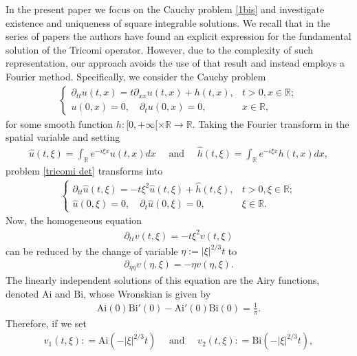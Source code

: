 \documentclass{article}
\begin{document}
In the present paper we focus on the Cauchy problem \eqref{1bis} and investigate existence and uniqueness of square integrable solutions. We recall that in the series of papers \cite{Gelfand1,Gelfand2,Gelfand2bis,Gelfand3} the authors have found an explicit expression for the fundamental solution of the Tricomi operator. However, due to the complexity of such representation, our approach avoids the use of that result and instead employs a Fourier method. Specifically, we consider the Cauchy problem	
\begin{align}\label{tricomi det}
\begin{cases}
\partial_{tt} u(t,x)=t\partial_{xx}u(t,x)+h(t,x),& t>0,x\in\mathbb{R};\\
u(0,x)=0,\quad \partial_{t}u(0,x)=0,& x\in\mathbb{R},
\end{cases}
\end{align}
for some smooth function $h:[0,+\infty[\times\mathbb{R}\to\mathbb{R}$. Taking the Fourier transform in the spatial variable and setting
\begin{align*}
\widehat{u}(t,\xi) = \int_{\mathbb{R}} e^{-i\xi x} u(t,x)dx\quad\mbox{ and }\quad\widehat{h}(t,\xi) = \int_{\mathbb{R}} e^{-i\xi x} h(t,x)dx,
\end{align*}
problem \eqref{tricomi det} transforms into 
\begin{align}\label{tricomi det 2}
\begin{cases}
\partial_{tt} \widehat{u}(t,\xi)=-t\xi^2\widehat{u}(t,\xi)+\widehat{h}(t,\xi),& t>0,\xi\in\mathbb{R};\\
\widehat{u}(0,\xi)=0,\quad \partial_{t}\widehat{u}(0,\xi)=0,& \xi\in\mathbb{R}.
\end{cases}
\end{align}
Now, the homogeneous equation
\begin{align*}
\partial_{tt} v(t,\xi)=-t\xi^2v(t,\xi)
\end{align*}
can be reduced by the change of variable $\eta := |\xi|^{2/3} t$ to
\begin{align*}
\partial_{\eta\eta} v(\eta,\xi)=-\eta v(\eta,\xi).
\end{align*}
The linearly independent solutions of this equation are the Airy functions, denoted $\mathrm{Ai}$ and $\mathrm{Bi}$, whose Wronskian is given by
\begin{align*}
\mathrm{Ai}(0)\mathrm{Bi}'(0) - \mathrm{Ai}'(0)\mathrm{Bi}(0) = \frac{1}{\pi}.
\end{align*}
Therefore, if we set
\begin{align*}
v_1(t,\xi): = \mathrm{Ai}\!\left(-|\xi|^{2/3} t\right)\quad\mbox{ and }\quad
v_2(t,\xi): = \mathrm{Bi}\!\left(-|\xi|^{2/3} t\right),
\end{align*}
\end{document}
